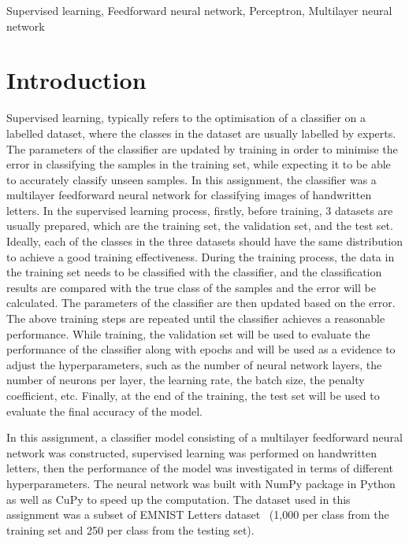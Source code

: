 \documentclass[conference]{IEEEtran}
\begin{document}
\begin{IEEEkeywords}
    Supervised learning, Feedforward neural network, Perceptron, Multilayer neural network
\end{IEEEkeywords}

\section{Introduction}

Supervised learning, typically refers to the optimisation of a classifier on a labelled dataset, where the classes in the dataset are usually labelled by experts. The parameters of the classifier are updated by training in order to minimise the error in classifying the samples in the training set, while expecting it to be able to accurately classify unseen samples. In this assignment, the classifier was a multilayer feedforward neural network for classifying images of handwritten letters. In the supervised learning process, firstly, before training, 3 datasets are usually prepared, which are the training set, the validation set, and the test set. Ideally, each of the classes in the three datasets should have the same distribution to achieve a good training effectiveness. During the training process, the data in the training set needs to be classified with the classifier, and the classification results are compared with the true class of the samples and the error will be calculated. The parameters of the classifier are then updated based on the error. The above training steps are repeated until the classifier achieves a reasonable performance. While training, the validation set will be used to evaluate the performance of the classifier along with epochs and will be used as a evidence to adjust the hyperparameters, such as the number of neural network layers, the number of neurons per layer, the learning rate, the batch size, the penalty coefficient, etc. Finally, at the end of the training, the test set will be used to evaluate the final accuracy of the model.

In this assignment, a classifier model consisting of a multilayer feedforward neural network was constructed, supervised learning was performed on handwritten letters, then the performance of the model was investigated in terms of different hyperparameters. The neural network was built with NumPy package in Python as well as CuPy to speed up the computation. The dataset used in this assignment was a subset of EMNIST Letters dataset~\cite{cohen2017emnist} (1,000 per class from the training set and 250 per class from the testing set).
\end{document}
